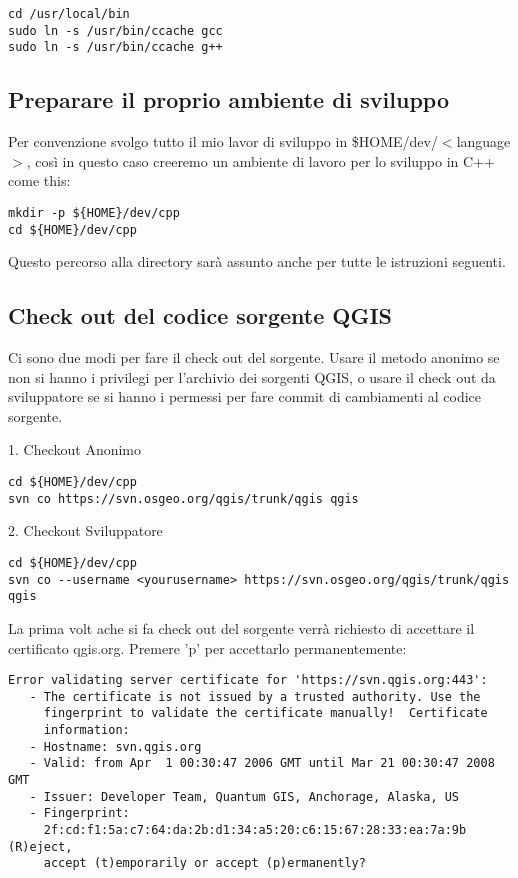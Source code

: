 \begin{verbatim}
cd /usr/local/bin 
sudo ln -s /usr/bin/ccache gcc 
sudo ln -s /usr/bin/ccache g++ 
\end{verbatim}

\subsection{Preparare il proprio ambiente di sviluppo}
Per convenzione svolgo tutto il mio lavor di sviluppo in \$HOME/dev/$<$language$>$, così in questo caso creeremo un ambiente di lavoro per lo sviluppo in C++ come
this:

\begin{verbatim}
mkdir -p ${HOME}/dev/cpp 
cd ${HOME}/dev/cpp 
\end{verbatim}

Questo percorso alla directory sarà assunto anche per tutte le istruzioni seguenti.

\subsection{Check out del codice sorgente QGIS}
Ci sono due modi per fare il check out del sorgente. Usare il metodo anonimo se non si hanno i privilegi per l'archivio dei sorgenti QGIS, o usare il check out da sviluppatore se si hanno i permessi per fare commit di cambiamenti al codice sorgente.

1.  Checkout Anonimo

\begin{verbatim}
cd ${HOME}/dev/cpp 
svn co https://svn.osgeo.org/qgis/trunk/qgis qgis
\end{verbatim}

2. Checkout Sviluppatore

\begin{verbatim}
cd ${HOME}/dev/cpp 
svn co --username <yourusername> https://svn.osgeo.org/qgis/trunk/qgis qgis 
\end{verbatim}

La prima volt ache si fa check out del sorgente verrà richiesto di accettare il certificato qgis.org. Premere 'p' per accettarlo permanentemente:

\begin{verbatim}
Error validating server certificate for 'https://svn.qgis.org:443':
   - The certificate is not issued by a trusted authority. Use the
     fingerprint to validate the certificate manually!  Certificate
     information:
   - Hostname: svn.qgis.org
   - Valid: from Apr  1 00:30:47 2006 GMT until Mar 21 00:30:47 2008 GMT
   - Issuer: Developer Team, Quantum GIS, Anchorage, Alaska, US
   - Fingerprint:
     2f:cd:f1:5a:c7:64:da:2b:d1:34:a5:20:c6:15:67:28:33:ea:7a:9b (R)eject,
     accept (t)emporarily or accept (p)ermanently?  
\end{verbatim}

